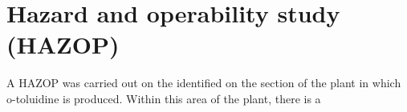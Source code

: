 \section{Hazard and operability study (HAZOP) }
 
A HAZOP was carried out on the identified on the section of the plant in which o-toluidine is produced. Within this area of the plant, there is a 